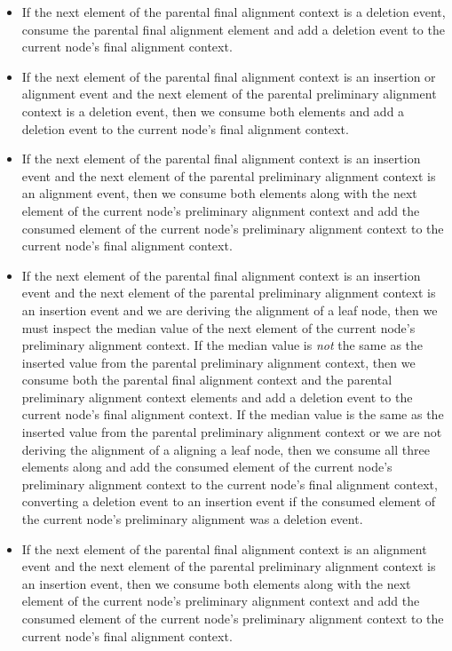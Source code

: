 \documentclass[11pt]{article}
\begin{document}
\begin{itemize}

\item If the next element of the parental final alignment context is a deletion event, consume the parental final alignment element and add a deletion event to the current node's final alignment context.

\item If the next element of the parental final alignment context is an insertion or alignment event and the next element of the parental preliminary alignment context is a deletion event, then we consume both elements and add a deletion event to the current node's final alignment context.

\item If the next element of the parental final alignment context is an insertion event and the next element of the parental preliminary alignment context is an alignment event, then we consume both elements along with the next element of the current node's preliminary alignment context and add the consumed element of the current node's preliminary alignment context to the current node's final alignment context.

\item If the next element of the parental final alignment context is an insertion event and the next element of the parental preliminary alignment context is an insertion event and we are deriving the alignment of a leaf node, then we must inspect the median value of the next element of the current node's preliminary alignment context.
If the median value is \textit{not} the same as the inserted value from the parental preliminary alignment context, then we consume both the parental final alignment context and the parental preliminary alignment context elements and add a deletion event to the current node's final alignment context. 
If the median value is the same as the inserted value from the parental preliminary alignment context or we are not deriving the alignment of a aligning a leaf node, then we consume all three elements along and add the consumed element of the current node's preliminary alignment context to the current node's final alignment context, converting a deletion event to an insertion event if the consumed element of the current node's preliminary alignment was a deletion event.

\item If the next element of the parental final alignment context is an alignment event and the next element of the parental preliminary alignment context is an insertion event, then we consume both elements along with the next element of the current node's preliminary alignment context and add the consumed element of the current node's preliminary alignment context to the current node's final alignment context.


\end{itemize}
\end{document}
